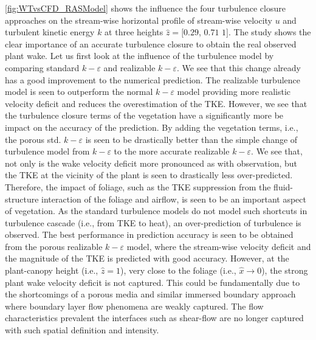 \cref{fig:WTvsCFD_RASModel} shows the influence the four turbulence closure approaches on the stream-wise horizontal profile of stream-wise velocity $u$ and turbulent kinetic energy $k$ at three heights $\hat{z} = [0.29$, $0.71$ $1]$. The study shows the clear importance of an accurate turbulence closure to obtain the real observed plant wake. Let us first look at the influence of the turbulence model by comparing standard $k-\varepsilon$ and realizable $k-\varepsilon$. We see that this change already has a good improvement to the numerical prediction. The realizable turbulence model is seen to outperform the normal $k-\varepsilon$ model providing more realistic velocity deficit and reduces the overestimation of the TKE. However, we see that the turbulence closure terms of the vegetation have a significantly more be impact on the accuracy of the prediction. By adding the vegetation terms, i.e., the porous std. $k-\varepsilon$ is seen to be drastically better than the simple change of turbulence model from $k-\varepsilon$ to the more accurate realizable $k-\varepsilon$. We see that, not only is the wake velocity deficit more pronounced as with observation, but the TKE at the vicinity of the plant is seen to drastically less over-predicted. Therefore, the impact of foliage, such as the TKE suppression from the fluid-structure interaction of the foliage and airflow, is seen to be an important aspect of vegetation. As the standard turbulence models do not model such shortcuts in turbulence cascade (i.e., from TKE to heat), an over-prediction of turbulence is observed. The best performance in prediction accuracy is seen to be obtained from the porous realizable $k-\varepsilon$ model, where the stream-wise velocity deficit and the magnitude of the TKE is predicted with good accuracy. However, at the plant-canopy height (i.e., $\hat{z} = 1$), very close to the foliage (i.e., $\hat{x} \rightarrow 0$), the strong plant wake velocity deficit is not captured. This could be fundamentally due to the shortcomings of a porous media and similar immersed boundary approach where boundary layer flow phenomena are weakly captured. The flow characteristics prevalent the interfaces such as shear-flow are no longer captured with such spatial definition and intensity. 

